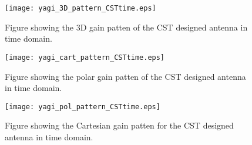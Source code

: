 \begin{figure}[!h]
  \centering
  \texttt{[image: yagi\_3D\_pattern\_CSTtime.eps]}
  \caption{Figure showing the 3D gain patten of the CST designed antenna in time domain.}
  \label{fig:yagi_3D_pattern_CSTtime}
\end{figure}

\begin{figure}[!h]
  \centering
  \texttt{[image: yagi\_cart\_pattern\_CSTtime.eps]}
  \caption{Figure showing the polar gain patten of the CST designed antenna in time domain.}
  \label{fig:yagi_pol_pattern_CSTtime}
\end{figure}

\begin{figure}[!h]
  \centering
  \texttt{[image: yagi\_pol\_pattern\_CSTtime.eps]}
  \caption{Figure showing the Cartesian gain patten for the CST designed antenna in time domain.}
  \label{fig:yagi_cart_pattern_CSTtime}
\end{figure}